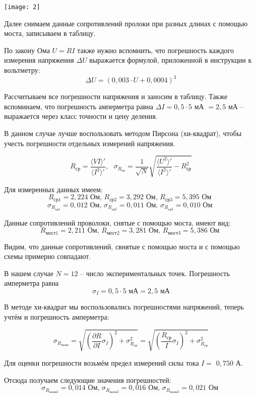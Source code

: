 \documentclass[a4paper, 12pt]{article} %
\begin{document}
\begin{center}
    {\texttt{[image: 2]}}
\end{center}

Далее снимаем данные сопротивлений пролоки при разных длинах с помощью моста, записываем в таблицу.

По закону Ома $U=RI$ также нужно вспомнить, что погрешность каждого измерения напряжения $\Delta U$ выражается формулой, приложенной в инструкции к вольтметру:
\[\Delta U = (0,003\cdot U + 0,0004)^{3}\]

Рассчитываем все погрешности напряжения и заносим в таблицу. Также вспоминаем, что погрешность амперметра равна $\Delta I = 0,5 \cdot 5$ мА $= 2,5$ мА -- выражается через класс точности и цену деления.

В данном случае лучше воспользовать методом Пирсона (хи-квадрат), чтобы учесть погрешности отдельных измерений напряжения. 

\[R_{\text{ср}} = \frac{\langle VI \rangle '}{\langle I^2 \rangle '}, \text{ } \sigma_{R_{\text{ср}}} = \frac{1}{\sqrt{N}} \sqrt{\frac{\langle U^2 \rangle '}{\langle I^2 \rangle '} - R^2_{\text{ср}}}\]

Для измеренных данных имеем:
\[R_{\text{ср}1} = 2,224 \text{ Ом, }R_{\text{ср}2} = 3,292\text{ Ом, }R_{\text{ср}3} = 5,395\text{ Ом }\]
\[\sigma_{R_{\text{ср}1}} = 0,012 \text{ Ом, }\sigma_{R_{\text{ср}2}} = 0,011\text{ Ом, }\sigma_{R_{\text{ср}3}} = 0,010\text{ Ом }\]

Данные сопротивлений проволоки, снятые с помощью моста, имеют вид:
\[R_{\text{мост}1} = 2,211 \text{ Ом, }R_{\text{мост}2} = 3,281\text{ Ом, }R_{\text{мост}3} = 5,386\text{ Ом }\]

Видим, что данные сопротивлений, свнятые с помощью моста и с помощью схемы примерно совпадают.

В нашем случае $N = 12$ -- число экспериментальных точек. Погрешность амперметра равна
\[\sigma_I = 0,5 \cdot 5 \text{ мА} = 2,5 \text{ мА}\]

В методе хи-квадрат мы воспользовались погрешностями напряжений, теперь учтём и погрешность амперметра:

\[\sigma_{R_{\text{полн}}} = \sqrt{ \left(\frac{\partial R}{\partial I} \sigma_I\right)^2 + \sigma_{R_{\text{ср}}}^2} = \sqrt{ \left(\frac{R_{\text{ср}}}{I} \sigma_I\right)^2 + \sigma_{R_{\text{ср}}}^2}\]

Для оценки погрешности возьмём предел измерений силы тока $I =$ $0,750$ А.

Отсюда получаем следующие значения погрешностей:
\[\sigma_{R_{\text{полн}1}} = 0,014 \text{ Ом, }\sigma_{R_{\text{полн}2}} = 0,016\text{ Ом, }\sigma_{R_{\text{полн}3}} = 0,021\text{ Ом }\]
\end{document}
